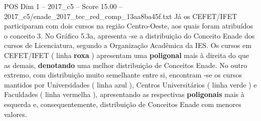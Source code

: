 \begin{textsample}{POS Dim 1 – 2017\_c5 – Score 15.00 – 2017\_c5/enade\_2017\_tec\_red\_comp\_13aa8ba45f.txt}
Já os CEFET/IFET participaram com dois cursos na região Centro-Oeste, aos quais foram atribuídos o conceito 3.
No Gráfico 5.3a, apresenta -se a distribuição do Conceito Enade dos cursos de Licenciatura, segundo a Organização Acadêmica da IES.
Os cursos em CEFET/IFET ( linha \textbf{roxa} ) apresentam uma \textbf{poligonal} mais à direita do que as demais, \textbf{denotando} uma melhor distribuição de Conceitos Enade.
No outro extremo, com distribuição muito semelhante entre si, encontram -se os cursos mantidos por Universidades ( linha azul ), Centros Universitários ( linha verde ) e Faculdades ( linha vermelha ), apresentando as respectivas \textbf{poligonais} mais à esquerda e, consequentemente, distribuição de Conceitos Enade com menores valores.

\end{textsample}

